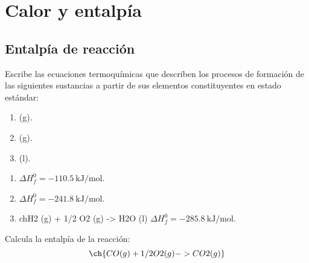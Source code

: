 \section{Calor y entalpía}

  \subsection*{Entalpía de reacción}


    \begin{exercise}[
        tags    = {termodinámica, entalpía, entalpia de reacción, calor},
        topics  = {química, termoquímica, termodinámica},
        source  = {FQ 1B ANA 2016, p164, e5},
      ]
      Escribe las ecuaciones termoquímicas que describen los procesos de formación de las siguientes sustancias a partir de sus elementos constituyentes en estado estándar:
      \begin{enumerate}
        \item {} (g).
        \item {} (g).
        \item {} (l).
      \end{enumerate}
    \end{exercise}

    \begin{solution}
      \begin{enumerate}
        \item {} \( \Delta H^0_f = \SI{-110.5}{\kilo\joule\per\mole} \).
        \item {} \( \Delta H^0_f = \SI{-241.8}{\kilo\joule\per\mole} \).
        \item ch{H2 (g) + 1/2 O2 (g) -> H2O (l)} \( \Delta H^0_f = \SI{-285.8}{\kilo\joule\per\mole} \).
      \end{enumerate}
    \end{solution}




    \begin{exercise}[
        tags    = {termodinámica, entalpía, entalpia de reacción, calor},
        topics  = {química, termoquímica, termodinámica},
        source  = {FQ 1B ANA 2016, p165, e14},
      ]
      Calcula la entalpía de la reacción:
      \[ \ch{CO (g) + 1/2 O2 (g) -> CO2 (g)} \]
    \end{exercise}

